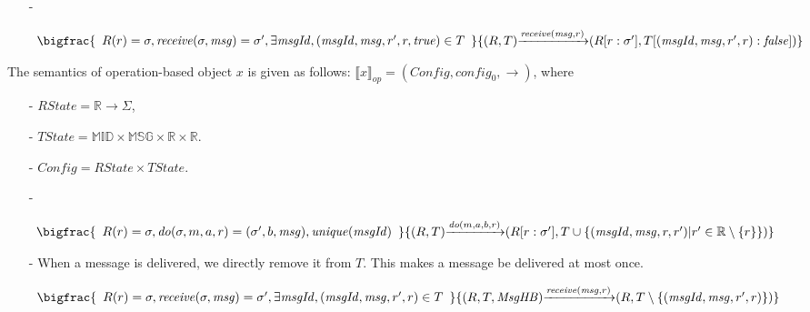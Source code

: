 {\begin{itemize}
\item[-]

$\begin{array}{l c}
   \bigfrac{
   \begin{array}{c}
      R(r) = \sigma, \mathit{receive}(\sigma,\mathit{msg}) = \sigma', \exists \mathit{msgId},(\mathit{msgId},\mathit{msg},r',r,\mathit{true}) \in T
   \end{array}}
     {(R,T) {\xrightarrow{\mathit{receive}(\mathit{msg},r)}} (R[r:\sigma'],T[(\mathit{msgId},\mathit{msg},r',r):\mathit{false}])}
\end{array}$
\end{itemize}



The semantics of operation-based object $x$ is given as follows: $\llbracket x \rrbracket_{\mathit{op}} = (\mathit{Config},\mathit{config}_0,\rightarrow)$, where

\begin{itemize}
\setlength{\itemsep}{0.5pt}
\item[-] $\mathit{RState} = \mathbb{R} \rightarrow \Sigma$,

\item[-] $\mathit{TState} = \mathbb{MID} \times \mathbb{MSG} \times \mathbb{R} \times \mathbb{R}$.

\item[-] $\mathit{Config} = \mathit{RState} \times \mathit{TState}$.

\item[-]

$\begin{array}{l c}
   \bigfrac{
   \begin{array}{c}
     R(r) = \sigma, \mathit{do}(\sigma,m,a,r) = (\sigma',b,\mathit{msg}), \mathit{unique}(\mathit{msgId})
   \end{array}}
     {(R,T) {\xrightarrow{\mathit{do}(m,a,b,r)}} (R[r:\sigma'],T \cup \{ (\mathit{msgId},\mathit{msg},r,r') \vert r' \in \mathbb{R} \setminus \{ r \} \})}
\end{array}$

\item[-] When a message is delivered, we directly remove it from $T$. This makes a message be delivered at most once.

$\begin{array}{l c}
   \bigfrac{
   \begin{array}{c}
      R(r) = \sigma, \mathit{receive}(\sigma,\mathit{msg}) = \sigma', \exists \mathit{msgId},(\mathit{msgId},\mathit{msg},r',r) \in T
   \end{array}}
     {(R,T,\mathit{MsgHB}) {\xrightarrow{\mathit{receive}(\mathit{msg},r)}} (R,T \setminus \{ (\mathit{msgId},\mathit{msg},r',r) \} )}
\end{array}$
\end{itemize}

}

